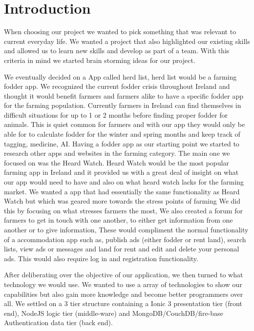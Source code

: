 \documentclass[12pt,a4paper,oneside,openany]{book}
\begin{document}
\chapter{Introduction}
When choosing our project we wanted to pick something that was relevant to current everyday life. We wanted a project that also highlighted our existing skills and allowed us to learn new skills and develop as part of a team. With this criteria in mind we started brain storming ideas for our project.  

We eventually decided on a App called herd list, herd list would be a farming fodder app. We recognized the current fodder crisis throughout Ireland and thought it would benefit farmers and farmers alike to have a specific fodder app for the farming population.
Currently farmers in Ireland can find themselves in difficult situations for up to 1 or 2 months before finding proper fodder for animals.
This is quiet common for farmers and with our app they would only be able for to calculate fodder for the winter and spring months and keep track of tagging, medicine, AI.
\cite{Fodder}
Having a fodder app as our starting point we started to research other apps and websites in the farming category. The main one we focused on was the Heard Watch. Heard Watch would be the most popular farming app in Ireland and it provided us with a great deal of insight on what our app would need to have and also on what heard watch lacks for the farming market.
\cite{HerdApp}
We wanted a app that had essentially the same functionality as Heard Watch but which was geared more towards the stress points of farming We did this by focusing on what stresses farmers the most, We also created a forum for farmers to get in touch with one another, to either get information from one another or to give information, These would compliment the normal functionality of a accommodation app such as, publish ads (either fodder or rent land), search lists, view ads or messages and land for rent and edit and delete your personal ads. This would also require log in and registration functionality.  

After deliberating over the objective of our application, we then turned to what technology we would use. We wanted to use a array of technologies to show our capabilities but also gain more knowledge and become better programmers over all. We settled on a 3 tier structure containing a Ionic 3 presentation tier (front end), NodeJS logic tier (middle-ware)  and MongoDB/CouchDB/fire-base Authentication data tier (back end).
\end{document}
